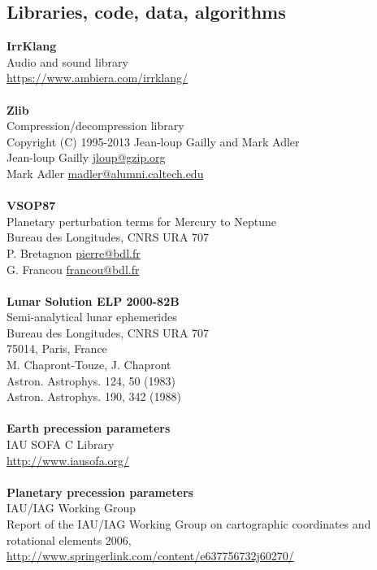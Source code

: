 \documentclass[Orbiter User Manual.tex]{subfiles}
\begin{document}
\subsection{Libraries, code, data, algorithms}
\textbf{IrrKlang}\\
Audio and sound library\\
\url{https://www.ambiera.com/irrklang/}\\
\\
\textbf{Zlib}\\
Compression/decompression library\\
Copyright (C) 1995-2013 Jean-loup Gailly and Mark Adler\\
Jean-loup Gailly \href{mailto:jloup@gzip.org}{jloup@gzip.org}\\
Mark Adler \href{mailto:madler@alumni.caltech.edu}{madler@alumni.caltech.edu}\\
\\
\textbf{VSOP87}\\
Planetary perturbation terms for Mercury to Neptune\\
Bureau des Longitudes, CNRS URA 707\\
P. Bretagnon \href{mailto:pierre@bdl.fr}{pierre@bdl.fr}\\
G. Francou \href{mailto:francou@bdl.fr}{francou@bdl.fr}\\
\\
\textbf{Lunar Solution ELP 2000-82B}\\
Semi-analytical lunar ephemerides\\
Bureau des Longitudes, CNRS URA 707\\
75014, Paris, France\\
M. Chapront-Touze, J. Chapront\\
Astron. Astrophys. 124, 50 (1983)\\
Astron. Astrophys. 190, 342 (1988)\\
\\
\textbf{Earth precession parameters}\\
IAU SOFA C Library\\
\url{http://www.iausofa.org/}\\
\\
\textbf{Planetary precession parameters}\\
IAU/IAG Working Group\\
Report of the IAU/IAG Working Group on cartographic coordinates and rotational elements 2006, \url{http://www.springerlink.com/content/e637756732j60270/}\\
\\
\end{document}

